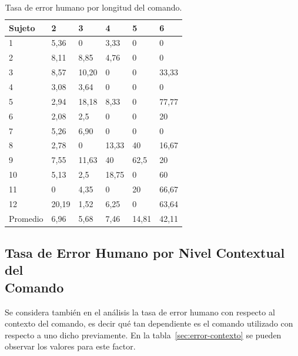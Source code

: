 \begin{table}[H]
\centering
\footnotesize
\begin{tabular}{|p{1.6cm}|p{1.6cm}|p{1.6cm}|p{1.6cm}|p{1.6cm}|p{1.6cm}|}
\hline
    Sujeto & 2 & 3 & 4 & 5 & 6  \\
    \hline 
    1 & 5,36   & 0     & 3,33  &0   &0 \\
    2 & 8,11   & 8,85  & 4,76  &0   &0 \\
    3 & 8,57   & 10,20 & 0 &  0  &33,33 \\
    4 & 3,08   & 3,64 & 0  & 0  & 0 \\
    5 & 2,94   & 18,18 & 8,33 &  0 & 77,77 \\
    6 & 2,08   & 2,5 & 0 & 0 & 20 \\
    7 & 5,26   & 6,90 & 0 & 0 & 0 \\
    8 & 2,78   & 0 & 13,33 & 40 & 16,67 \\
    9 & 7,55   & 11,63 & 40  &  62,5  & 20 \\
    10 & 5,13  & 2,5  & 18,75  &  0 & 60 \\
    11 & 0     & 4,35 & 0 & 20 & 66,67 \\
    12 & 20,19 & 1,52 & 6,25 & 0  & 63,64 \\
    \hline 
    Promedio & 6,96 & 5,68 & 7,46 & 14,81 & 42,11 \\
\hline
\end{tabular}
\caption{Tasa de error humano por longitud del comando.}
\label{sec:error-longitud}
\end{table}

\subsection[Tasa de Error Humano por Nivel Contextual del Comando]
{Tasa de Error Humano por Nivel Contextual del \\ Comando}

Se considera tambi\'en en el an\'alisis la tasa de error humano con respecto al contexto del comando, es decir
qu\'e tan dependiente es el comando utilizado con respecto a uno dicho previamente. 
En la tabla~\ref{sec:error-contexto} se pueden observar los valores para este factor.

